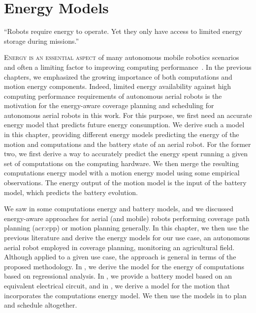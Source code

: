 
%
%
%
%
\chapter{Energy Models}
\label{cp:model}

\begin{chapquote}{\cite{ondruska2015scheduled}}
  ``Robots require energy to operate. Yet they only have access to limited energy storage during missions.''
\end{chapquote}

\vspace*{1em}

\lettrine{E}{nergy is an essential aspect} of many autonomous mobile robotics scenarios~\citep{mei2005case} and often a limiting factor to improving computing performance~\citep{horowitz2014computing}. In the previous chapters, we emphasized the growing importance of both computations and motion energy components. Indeed, limited energy availability against high computing performance requirements of autonomous aerial robots is the motivation for the energy-aware coverage planning and scheduling for autonomous aerial robots in this work. For this purpose, we first need an accurate energy model that predicts future energy consumption. We derive such a model in this chapter, providing different energy models predicting the energy of the motion and computations and the battery state of an aerial robot. For the former two, we first derive a way to accurately predict the energy spent running a given set of computations on the computing hardware. We then merge the resulting computations energy model with a motion energy model using some empirical observations. The energy output of the motion model is the input of the battery model, which predicts the battery evolution.

We saw in  some computations energy and battery models, and we discussed energy-aware approaches for aerial (and mobile) robots performing coverage path planning (\Gls{acr:cpp}) or motion planning generally. In this chapter, we then use the previous literature and derive the energy models for our use case, an autonomous aerial robot employed in coverage planning, monitoring an agricultural field. Although applied to a given use case, the approach is general in terms of the proposed methodology. In , we derive the model for the energy of computations based on regressional analysis. In , we provide a battery model based on an equivalent electrical circuit, and in , we derive a model for the motion that incorporates the computations energy model. We then use the models in  to plan and schedule altogether.

